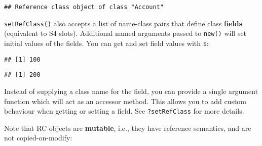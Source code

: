 \begin{verbatim}
## Reference class object of class "Account"
\end{verbatim}

\texttt{setRefClass()} also accepts a list of name-class pairs that
define class \textbf{fields} (equivalent to S4 slots). Additional named
arguments passed to \texttt{new()} will set initial values of the
fields. You can get and set field values with \texttt{\$}:

\begin{Shaded}
\begin{Highlighting}[]
\StringTok{ }\NormalTok{(}\NormalTok{,}
   \NormalTok{(} \NormalTok{))}

\StringTok{ }\OperatorTok{$}\NormalTok{(} \NormalTok{)}
\OperatorTok{$}
\end{Highlighting}
\end{Shaded}

\begin{verbatim}
## [1] 100
\end{verbatim}

\begin{Shaded}
\begin{Highlighting}[]
\OperatorTok{$}\StringTok{ }
\OperatorTok{$}
\end{Highlighting}
\end{Shaded}

\begin{verbatim}
## [1] 200
\end{verbatim}

Instead of supplying a class name for the field, you can provide a
single argument function which will act as an accessor method. This
allows you to add custom behaviour when getting or setting a field. See
\texttt{?setRefClass} for more details.

Note that RC objects are \textbf{mutable}, i.e., they have reference
semantics, and are not copied-on-modify:

\begin{Shaded}
\begin{Highlighting}[]
\StringTok{ }
\OperatorTok{$}
\end{Highlighting}
\end{Shaded}

